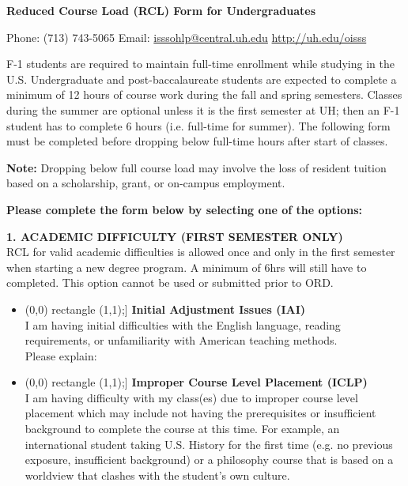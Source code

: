 \documentclass[11pt]{article}
\newcommand{\checkbox}{\tikz\draw[scale=0.5,thick] (0,0) rectangle (1,1);}
\begin{document}
\begin{center}
    {\Large \textbf{Reduced Course Load (RCL) Form for Undergraduates}}

    \vspace{0.2cm}
    Phone: (713) 743-5065 \quad Email: \href{mailto:isssohlp@central.uh.edu}{isssohlp@central.uh.edu} \quad \href{http://uh.edu/oisss}{http://uh.edu/oisss}
\end{center}

\noindent F-1 students are required to maintain full-time enrollment while studying in the U.S. Undergraduate and post-baccalaureate students are expected to complete a minimum of 12 hours of course work during the fall and spring semesters. Classes during the summer are optional unless it is the first semester at UH; then an F-1 student has to complete 6 hours (i.e. full-time for summer). The following form must be completed before dropping below full-time hours after start of classes.

\noindent \textbf{Note:} Dropping below full course load may involve the loss of resident tuition based on a scholarship, grant, or on-campus employment.

\vspace{0.5cm}
\noindent \textbf{Please complete the form below by selecting one of the options:}

\vspace{0.3cm}
\noindent \textbf{1. ACADEMIC DIFFICULTY (FIRST SEMESTER ONLY)}\\
RCL for valid academic difficulties is allowed once and only in the first semester when starting a new degree program. A minimum of 6hrs will still have to completed. This option cannot be used or submitted prior to ORD.

\begin{itemize}[leftmargin=0.5cm]
    \item[\checkbox] \textbf{Initial Adjustment Issues (IAI)}\\
    I am having initial difficulties with the English language, reading requirements, or unfamiliarity with American teaching methods.\\
    Please explain: \underline{\hspace{10cm}}

    \vspace{0.3cm}
    \item[\checkbox] \textbf{Improper Course Level Placement (ICLP)}\\
    I am having difficulty with my class(es) due to improper course level placement which may include not having the prerequisites or insufficient background to complete the course at this time. For example, an international student taking U.S. History for the first time (e.g. no previous exposure, insufficient background) or a philosophy course that is based on a worldview that clashes with the student's own culture.
\end{itemize}
\end{document}
